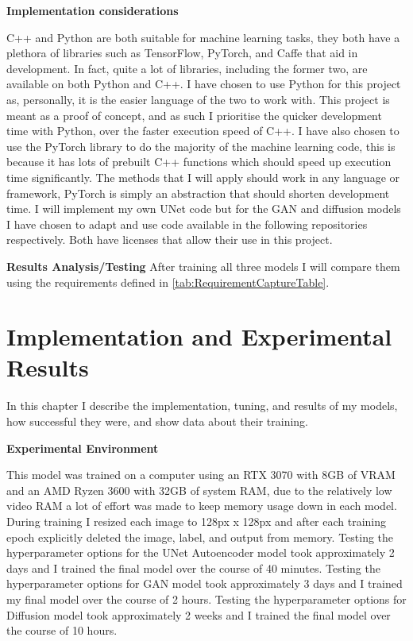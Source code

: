 \documentclass{UoYCSproject}
\begin{document}
\textbf{Implementation considerations}

C++ and Python are both suitable for machine learning tasks, they both have a plethora of libraries such as TensorFlow, PyTorch, and Caffe that aid in development. In fact, quite a lot of libraries, including the former two, are available on both Python and C++. I have chosen to use Python for this project as, personally, it is the easier language of the two to work with. This project is meant as a proof of concept, and as such I prioritise the quicker development time with Python, over the faster execution speed of C++. I have also chosen to use the PyTorch library to do the majority of the machine learning code, this is because it has lots of prebuilt C++ functions which should speed up execution time significantly. The methods that I will apply should work in any language or framework, PyTorch is simply an abstraction that should shorten development time. I will implement my own UNet code but for the GAN and diffusion models I have chosen to adapt and use code available in the following repositories \cite{PytorchPix2Pix, JanspiryPalette} respectively. Both have licenses that allow their use in this project. 

\textbf{Results Analysis/Testing}
After training all three models I will compare them using the requirements defined in \ref{tab:RequirementCaptureTable}.

\chapter{Implementation and Experimental Results}

In this chapter I describe the implementation, tuning, and results of my models, how successful they were, and show data about their training.




\textbf{Experimental Environment}

This model was trained on a computer using an RTX 3070 with 8GB of VRAM and an AMD Ryzen 3600 with 32GB of system RAM, due to the relatively low video RAM a lot of effort was made to keep memory usage down in each model. During training I resized each image to 128px x 128px and after each training epoch explicitly deleted the image, label, and output from memory.
Testing the hyperparameter options for the UNet Autoencoder model took approximately 2 days and I trained the final model over the course of 40 minutes.
Testing the hyperparameter options for GAN model took approximately 3 days and I trained my final model over the course of 2 hours.  
Testing the hyperparameter options for Diffusion model took approximately 2 weeks and I trained the final model over the course of 10 hours.
\end{document}
